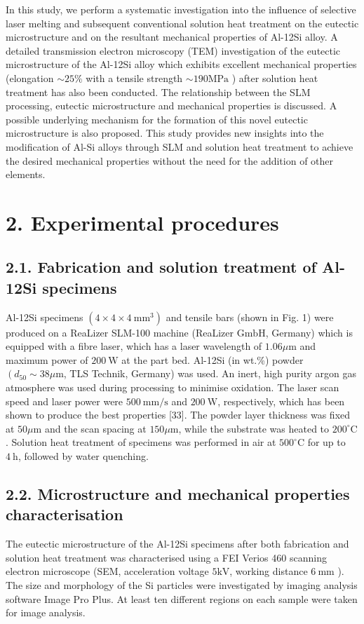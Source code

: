 \documentclass[10pt]{article}
\begin{document}
In this study, we perform a systematic investigation into the influence of selective laser melting and subsequent conventional solution heat treatment on the eutectic microstructure and on the resultant mechanical properties of Al-12Si alloy. A detailed transmission electron microscopy (TEM) investigation of the eutectic microstructure of the Al-12Si alloy which exhibits excellent mechanical properties (elongation $\sim 25 \%$ with a tensile strength $\sim 190 \mathrm{MPa}$ ) after solution heat treatment has also been conducted. The relationship between the SLM processing, eutectic microstructure and mechanical properties is discussed. A possible underlying mechanism for the formation of this novel eutectic microstructure is also proposed. This study provides new insights into the modification of Al-Si alloys through SLM and solution heat treatment to achieve the desired mechanical properties without the need for the addition of other elements.

\section*{2. Experimental procedures}
\subsection*{2.1. Fabrication and solution treatment of Al-12Si specimens}
Al-12Si specimens $\left(4 \times 4 \times 4 \mathrm{~mm}^{3}\right)$ and tensile bars (shown in Fig. 1) were produced on a ReaLizer SLM-100 machine (ReaLizer $\mathrm{GmbH}$, Germany) which is equipped with a fibre laser, which has a laser wavelength of $1.06 \mu \mathrm{m}$ and maximum power of $200 \mathrm{~W}$ at the part bed. Al-12Si (in wt.\%) powder $\left(d_{50} \sim 38 \mu \mathrm{m}\right.$, TLS Technik, Germany) was used. An inert, high purity argon gas atmosphere was used during processing to minimise oxidation. The laser scan speed and laser power were $500 \mathrm{~mm} / \mathrm{s}$ and $200 \mathrm{~W}$, respectively, which has been shown to produce the best properties [33]. The powder layer thickness was fixed at $50 \mu \mathrm{m}$ and the scan spacing at $150 \mu \mathrm{m}$, while the substrate was heated to $200^{\circ} \mathrm{C}$. Solution heat treatment of specimens was performed in air at $500^{\circ} \mathrm{C}$ for up to $4 \mathrm{~h}$, followed by water quenching.

\subsection*{2.2. Microstructure and mechanical properties characterisation}
The eutectic microstructure of the Al-12Si specimens after both fabrication and solution heat treatment was characterised using a FEI Verios 460 scanning electron microscope (SEM, acceleration voltage $5 \mathrm{kV}$, working distance $6 \mathrm{~mm}$ ). The size and morphology of the Si particles were investigated by imaging analysis software Image Pro Plus. At least ten different regions on each sample were taken for image analysis.
\end{document}
